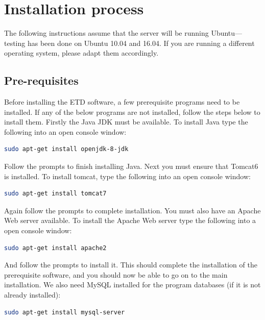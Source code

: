 \documentclass[a4paper,11pt]{article}
\begin{document}
\section{Installation process}
\label{sec:installation_process}

The following instructions assume that the server will be running Ubuntu---testing has been done on Ubuntu 10.04 and 16.04. If you are running a different operating system, please adapt them accordingly.

\subsection{Pre-requisites}
\label{sec:installation_process:prerequisites}

Before installing the ETD software, a few prerequisite programs need to be installed. If any of the below programs are not installed, follow the steps below to install them. Firstly the Java JDK must be available. To install Java type the following into an open console window: 

\begin{lstlisting}[language=bash]
 sudo apt-get install openjdk-8-jdk
\end{lstlisting}


Follow the prompts to finish installing Java. Next you must ensure that Tomcat6 is installed. To install tomcat, type the following into an open console window: 

\begin{lstlisting}[language=bash]
 sudo apt-get install tomcat7
\end{lstlisting}


Again follow the prompts to complete installation. You must also have an Apache Web server available. To install the Apache Web server type the following into a open console window: 

\begin{lstlisting}[language=bash]
 sudo apt-get install apache2
\end{lstlisting}

And follow the prompts to install it. This should complete the installation of the prerequisite software, and you should now be able to go on to the main installation. We also need MySQL installed for the program databases (if it is not already installed): 

\begin{lstlisting}[language=bash]
 sudo apt-get install mysql-server
\end{lstlisting}
\end{document}
